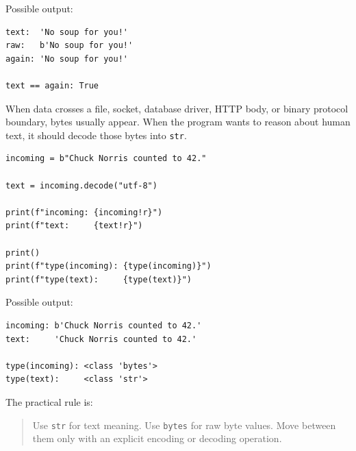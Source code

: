 Possible output:

\begin{verbatim}
text:  'No soup for you!'
raw:   b'No soup for you!'
again: 'No soup for you!'

text == again: True
\end{verbatim}

When data crosses a file, socket, database driver, HTTP body, or binary protocol boundary, bytes usually appear. When the program wants to reason about human text, it should decode those bytes into \texttt{str}.

\begin{verbatim}
incoming = b"Chuck Norris counted to 42."

text = incoming.decode("utf-8")

print(f"incoming: {incoming!r}")
print(f"text:     {text!r}")

print()
print(f"type(incoming): {type(incoming)}")
print(f"type(text):     {type(text)}")
\end{verbatim}

Possible output:

\begin{verbatim}
incoming: b'Chuck Norris counted to 42.'
text:     'Chuck Norris counted to 42.'

type(incoming): <class 'bytes'>
type(text):     <class 'str'>
\end{verbatim}

The practical rule is:

\begin{quote}
Use \texttt{str} for text meaning. Use \texttt{bytes} for raw byte values. Move between them only with an explicit encoding or decoding operation.
\end{quote}
